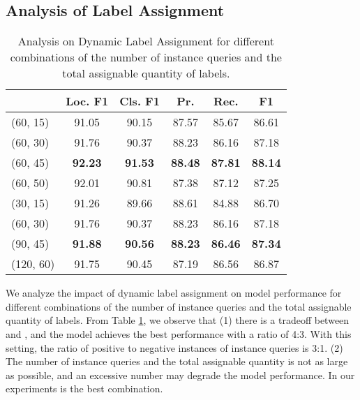 \documentclass[11pt]{article}
\begin{document}
\subsection{Analysis of Label Assignment}

\label{comb}


\begin{table}[h]
\centering
\small
\begin{tabular}{lccccc}
\toprule
 & Loc. F1 & Cls. F1 & Pr.  & Rec. & F1  \\
\midrule

(60, 15) & 91.05 & 90.15 & 87.57 & 85.67 & 86.61   \\
(60, 30) & 91.76 & 90.37 & 88.23 & 86.16& 87.18  \\
(60, 45) & \textbf{92.23} & \textbf{91.53}   &  \textbf{88.48} & \textbf{87.81}  & \textbf{88.14} \\
(60, 50) & 92.01 & 90.81 & 87.38 & 87.12 & 87.25  \\
\midrule
(30, 15)  & 91.26 & 89.66 & 88.61 & 84.88 & 86.70    \\
(60, 30) & 91.76 & 90.37 & 88.23 & 86.16& 87.18  \\
(90, 45) & \textbf{91.88} & \textbf{90.56} & \textbf{88.23} & \textbf{86.46} & \textbf{87.34}   \\
(120, 60) & 91.75 & 90.45  & 87.19 & 86.56 & 86.87  \\




\bottomrule
\end{tabular}
\caption{Analysis on Dynamic Label Assignment for different combinations of the number  of instance queries and the total assignable quantity  of labels.}
\label{tab:com}
\end{table}


We analyze the impact of dynamic label assignment on model performance for different combinations of the number  of instance queries and the total assignable quantity  of labels. 
From Table \ref{tab:com}, we observe that (1) there is a tradeoff between  and , and the model achieves the best performance with a ratio of 4:3. With this setting, the ratio of positive to negative instances of instance queries is 3:1.
(2) The number of instance queries and the total assignable quantity is not as large as possible, and an excessive number may degrade the model performance. In our experiments  is the best combination.















\label{comb}
\end{document}
